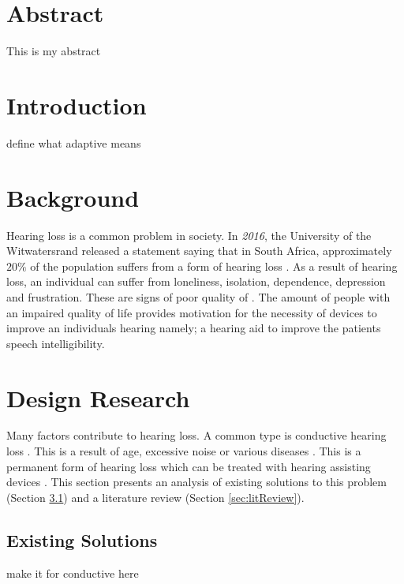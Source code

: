\documentclass[11pt,onecolumn]{witseiepaper}
\begin{document}
\tableofcontents
\newpage

\section*{Abstract}

This is my abstract

\section{Introduction}

define what adaptive means

\section{Background}

\noindent Hearing loss is a common problem in society. In \textit{2016}, the University of the Witwatersrand released a statement saying that in South Africa, approximately $20\%$ of the population suffers from a form of hearing loss \cite{witsHearingStats}. As a result of hearing loss, an individual can suffer from loneliness, isolation, dependence, depression and frustration. These are signs of poor quality of \cite{qualityOfLife}. The amount of people with an impaired quality of life provides motivation for the necessity of devices to improve an individuals hearing namely; a hearing aid to improve the patients speech intelligibility. 


\section{Design Research}

\noindent Many factors contribute to hearing loss. A common type is conductive hearing loss \cite{earinfo}. This is a result of age, excessive noise or various diseases \cite{hearIt}. This is a permanent form of hearing loss which can be treated with hearing assisting devices \cite{hearIt}. This section presents an analysis of existing solutions to this problem (Section \ref{sec:existSoln}) and a literature review (Section \ref{sec:litReview}).

\subsection{Existing Solutions}
\label{sec:existSoln}

make it for conductive here
\end{document}
